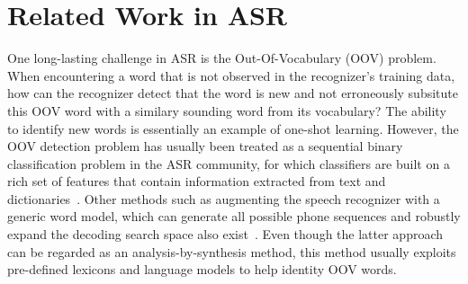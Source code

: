 \section{Related Work in ASR}

One long-lasting challenge in ASR is the Out-Of-Vocabulary (OOV) problem. When encountering a word that is not observed in the recognizer's training data, how can the recognizer detect that the word is new and not erroneously subsitute this OOV word with a similary sounding word from its vocabulary? The ability to identify new words is essentially an example of one-shot learning. However, the OOV detection problem has usually been treated as a sequential binary classification problem in the ASR community, for which classifiers are built on a rich set of features that contain information extracted from text and dictionaries~\cite{carolina,rastrow,asru,hazen}. Other methods such as augmenting the speech recognizer with a generic word model, which can generate all possible phone sequences and robustly expand the decoding search space also exist~\cite{bazzi,rastrow}. Even though the latter approach can be regarded as an analysis-by-synthesis method, this method usually exploits pre-defined lexicons and language models to help identity OOV words. 
